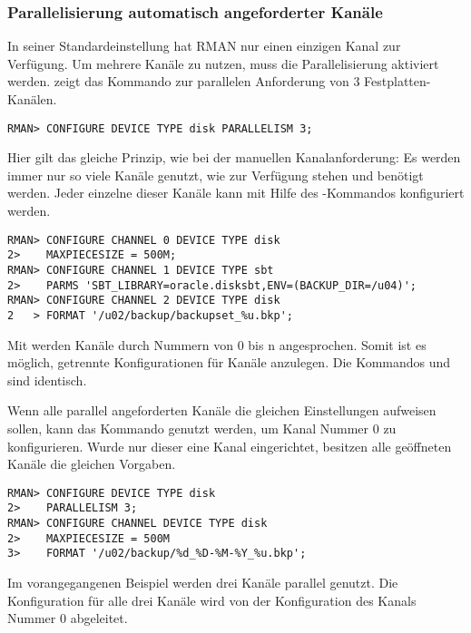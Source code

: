         \subsubsection{Parallelisierung automatisch angeforderter Kan\"ale}
          In seiner Standardeinstellung hat RMAN nur einen einzigen Kanal zur Verf\"ugung. Um mehrere Kan\"ale zu nutzen, muss die Parallelisierung aktiviert werden.  zeigt das Kommando zur parallelen Anforderung von 3 Festplatten-Kan\"alen.
          \begin{lstlisting}[caption={Parallelisierung von Kan\"alen},label=admin1019,language=rman]
RMAN> CONFIGURE DEVICE TYPE disk PARALLELISM 3;
          \end{lstlisting}
          Hier gilt das gleiche Prinzip, wie bei der manuellen Kanalanforderung: Es werden immer nur so viele Kan\"ale genutzt, wie zur Verf\"ugung stehen und ben\"otigt werden. Jeder einzelne dieser Kan\"ale kann mit Hilfe des -Kommandos konfiguriert werden.
          \begin{lstlisting}[caption={Unterschiedliche Kan\"ale vordefinieren},label=admin1020,language=rman]
RMAN> CONFIGURE CHANNEL 0 DEVICE TYPE disk
2>    MAXPIECESIZE = 500M;
RMAN> CONFIGURE CHANNEL 1 DEVICE TYPE sbt
2>    PARMS 'SBT_LIBRARY=oracle.disksbt,ENV=(BACKUP_DIR=/u04)';
RMAN> CONFIGURE CHANNEL 2 DEVICE TYPE disk
2   > FORMAT '/u02/backup/backupset_%u.bkp';
          \end{lstlisting}
          \begin{merke}
            Mit  werden Kan\"ale durch Nummern von 0 bis n angesprochen. Somit ist es m\"oglich, getrennte Konfigurationen f\"ur Kan\"ale anzulegen. Die Kommandos  und  sind identisch.
          \end{merke}
          Wenn alle parallel angeforderten Kan\"ale die gleichen Einstellungen aufweisen sollen, kann das Kommando  genutzt werden, um Kanal Nummer 0 zu konfigurieren. Wurde nur dieser eine Kanal eingerichtet, besitzen alle ge\"offneten Kan\"ale die gleichen Vorgaben.
          \begin{lstlisting}[caption={Parallele Anforderung von Kan\"alen mit gleicher Konfiguration},label=admin1021,language=rman]
RMAN> CONFIGURE DEVICE TYPE disk
2>    PARALLELISM 3;
RMAN> CONFIGURE CHANNEL DEVICE TYPE disk
2>    MAXPIECESIZE = 500M
3>    FORMAT '/u02/backup/%d_%D-%M-%Y_%u.bkp';
          \end{lstlisting}
          Im vorangegangenen Beispiel werden drei Kan\"ale parallel genutzt. Die Konfiguration f\"ur alle drei Kan\"ale wird von der Konfiguration des Kanals Nummer 0 abgeleitet.
